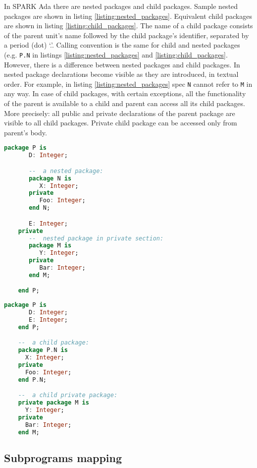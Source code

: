 In SPARK Ada there are nested packages and child packages. Sample nested packages are shown in listing \ref{listing:nested_packages}. Equivalent child packages are shown in listing \ref{listing:child_packages}. The name of a child package consists of the parent unit's name followed by the child package's identifier, separated by a period (dot) `.'. Calling convention is the same for child and nested packages (e.g. \lstinline{P.N} in listings \ref{listing:nested_packages} and \ref{listing:child_packages}. However, there is a difference between nested packages and child packages. In nested package declarations become visible as they are introduced, in textual order. For example, in listing \ref{listing:nested_packages} spec \lstinline{N} cannot refer to \lstinline{M} in any way. In case of child packages, with certain exceptions, all the functionality of the parent is available to a child and parent can access all its child packages. More precisely: all public and private declarations of the parent package are visible to all child packages. Private child package can be accessed only from parent's body.

\begin{lstlisting}[language=ada, frame=single, gobble=0, caption={Nested packages in SPARK Ada}, label={listing:nested_packages}]
	package P is
	   D: Integer;

	   --  a nested package:
	   package N is
	      X: Integer;
	   private
	      Foo: Integer;
	   end N;

	   E: Integer;
	private
	   --  nested package in private section:
	   package M is
	      Y: Integer;
	   private
	      Bar: Integer;
	   end M;

	end P;
\end{lstlisting}

\begin{lstlisting}[language=ada, frame=single, gobble=0, caption={Child packages in SPARK Ada}, label={listing:child_packages}]
	package P is
	   D: Integer;
	   E: Integer;
	end P;

	--  a child package:
	package P.N is
      X: Integer;
   	private
      Foo: Integer;
	end P.N;

	--  a child private package:
	private package M is
	  Y: Integer;
	private
	  Bar: Integer;
	end M;
\end{lstlisting}

\subsection{Subprograms mapping}
\label{codegen:mapping:subprograms}

